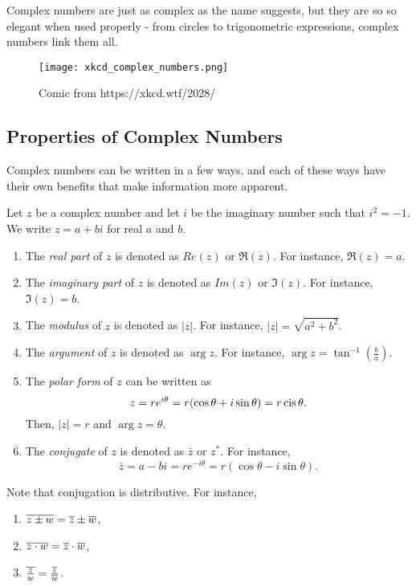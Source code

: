 \documentclass[../jarvis.tex]{subfiles}
\begin{document}
Complex numbers are just as complex as the name suggests, but they are so so elegant when used properly - from circles to trigonometric expressions, complex numbers link them all.
\begin{figure}[H]
    \centering
    \texttt{[image: xkcd\_complex\_numbers.png]}
    \caption{Comic from https://xkcd.wtf/2028/}
\end{figure}

\subsection{Properties of Complex Numbers \ez}
Complex numbers can be written in a few ways, and each of these ways have their own benefits that make information more apparent.

\begin{proposition}
    Let $z$ be a complex number and let $i$ be the imaginary number such that $i^2=-1$. We write $z=a+bi$ for real $a$ and $b$. 
    \begin{enumerate}    
    \item The \textit{real part} of $z$ is denoted as $Re(z)$ or $\Re(z)$. For instance, $\Re(z)=a$.
    \item The \textit{imaginary part} of $z$ is denoted as $Im(z)$ or $\Im(z)$. For instance, $\Im(z)=b$.
    \item The \textit{modulus} of $z$ is denoted as $|z|$. For instance, $|z|=\sqrt{a^2+b^2}$.
    \item The \textit{argument} of $z$ is denoted as $\arg z$. For instance, $\arg z=\tan^{-1} \left(\frac{b}{a}\right)$.
    \item The \textit{polar form} of $z$ can be written as
    $$z=re^{i\theta}=r(\cos\theta+i\sin\theta)=r\operatorname{cis}\theta.$$ Then, $|z|=r$ and $\arg z=\theta$.
    \item The \textit{conjugate} of $z$ is denoted as $\bar{z}$ or $z^*$. For instance, $$\bar{z}=a-bi=re^{-i\theta}=r(\cos\theta-i\sin\theta).$$
    \end{enumerate}
\end{proposition}
\begin{remark}
    Note that conjugation is distributive. For instance,
    \begin{enumerate}
        \item $\overline{z\pm w}=\overline{z}\pm\overline{w}$,
        \item $\overline{z\cdot w}=\overline{z}\cdot\overline{w}$,
        \item $\overline{\frac{z}{w}}=\frac{\overline{z}}{\overline{w}}$.
    \end{enumerate}
\end{remark}
\end{document}
